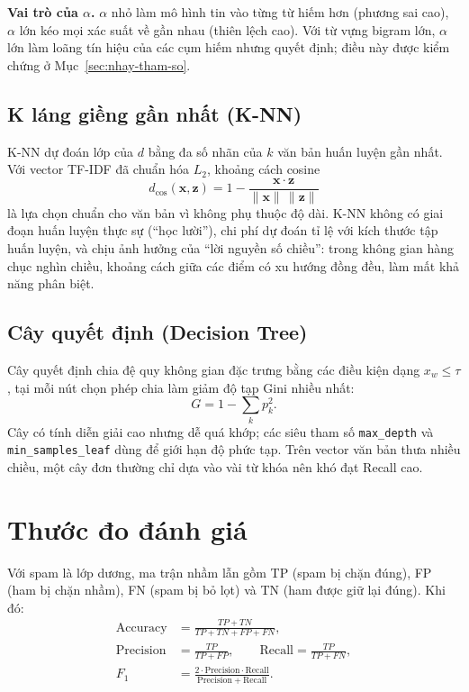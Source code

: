 \textbf{Vai trò của $\alpha$.} $\alpha$ nhỏ làm mô hình tin vào từng từ hiếm hơn (phương sai cao), $\alpha$ lớn kéo mọi xác suất về gần nhau (thiên lệch cao). Với từ vựng bigram lớn, $\alpha$ lớn làm loãng tín hiệu của các cụm hiếm nhưng quyết định; điều này được kiểm chứng ở Mục~\ref{sec:nhay-tham-so}.

\subsection{K láng giềng gần nhất (K-NN)}

K-NN dự đoán lớp của $d$ bằng đa số nhãn của $k$ văn bản huấn luyện gần nhất. Với vector TF-IDF đã chuẩn hóa $L_2$, khoảng cách cosine
\begin{equation}
d_{\cos}(\mathbf{x},\mathbf{z})=1-\frac{\mathbf{x}\cdot\mathbf{z}}{\lVert\mathbf{x}\rVert\,\lVert\mathbf{z}\rVert}
\end{equation}
là lựa chọn chuẩn cho văn bản vì không phụ thuộc độ dài. K-NN không có giai đoạn huấn luyện thực sự (``học lười''), chi phí dự đoán tỉ lệ với kích thước tập huấn luyện, và chịu ảnh hưởng của ``lời nguyền số chiều'': trong không gian hàng chục nghìn chiều, khoảng cách giữa các điểm có xu hướng đồng đều, làm mất khả năng phân biệt.

\subsection{Cây quyết định (Decision Tree)}

Cây quyết định chia đệ quy không gian đặc trưng bằng các điều kiện dạng $x_w\le\tau$, tại mỗi nút chọn phép chia làm giảm độ tạp Gini nhiều nhất:
\begin{equation}
G=1-\sum_{k}p_k^2 .
\end{equation}
Cây có tính diễn giải cao nhưng dễ quá khớp; các siêu tham số \texttt{max\_depth} và \texttt{min\_samples\_leaf} dùng để giới hạn độ phức tạp. Trên vector văn bản thưa nhiều chiều, một cây đơn thường chỉ dựa vào vài từ khóa nên khó đạt Recall cao.

\section{Thước đo đánh giá}

Với spam là lớp dương, ma trận nhầm lẫn gồm TP (spam bị chặn đúng), FP (ham bị chặn nhầm), FN (spam bị bỏ lọt) và TN (ham được giữ lại đúng). Khi đó:
\begin{align}
\mathrm{Accuracy}&=\frac{TP+TN}{TP+TN+FP+FN},\\
\mathrm{Precision}&=\frac{TP}{TP+FP},\qquad
\mathrm{Recall}=\frac{TP}{TP+FN},\\
F_1&=\frac{2\cdot\mathrm{Precision}\cdot\mathrm{Recall}}{\mathrm{Precision}+\mathrm{Recall}}.
\end{align}

